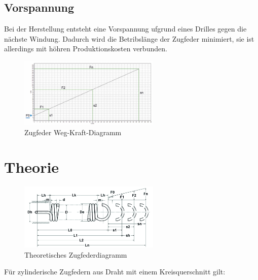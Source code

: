 \subsection{Vorspannung}
Bei der Herstellung entsteht eine Vorspannung ufgrund eines Drilles gegen die nächste
Windung. Dadurch wird die Betribslänge der Zugfeder minimiert, sie ist allerdings mit höhren Produktionskosten
verbunden.
\begin{figure}[H]
    \centering
    \includegraphics[width=0.6\textwidth]{bilder/Input/Vorspannung.jpg}
    \caption{Zugfeder Weg-Kraft-Diagramm \cite{KompZ}}
\end{figure}




















\newpage
\section{Theorie}
\begin{figure}[H]
    \centering
    \includegraphics[width=0.6\textwidth]{bilder/Input/Zugfeder_technisch.jpg}
    \caption{Theoretisches Zugfederdiagramm \cite{AusM2}}
\end{figure}
Für zylinderische Zugfedern aus Draht mit einem Kreisquerschnitt gilt:\\\\

